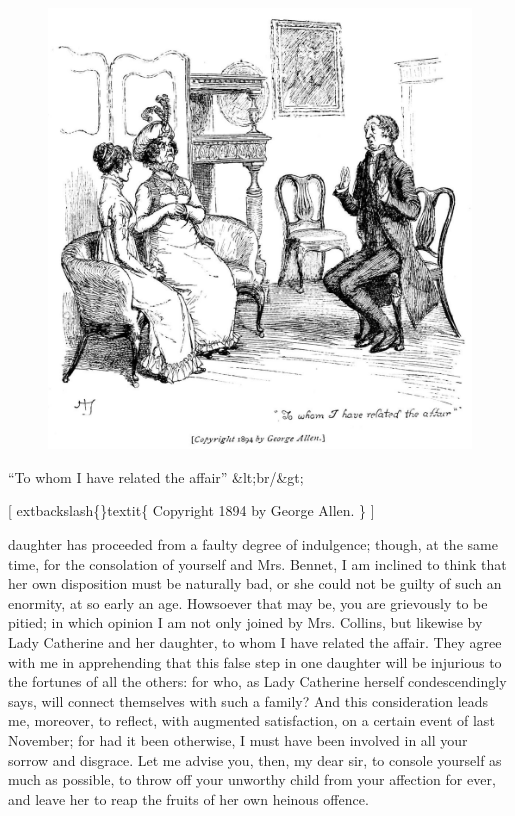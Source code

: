 \documentclass[10pt]{book}
\begin{document}
\begin{figure}[h]
\centering
\includegraphics[width=\linewidth]{images/i_392.jpg}
\end{figure}

      “To whom I have related the affair”
      &lt;br/&gt;

      [
      	extbackslash\{\}textit\{
       Copyright 1894 by George Allen.
      \}
      ]
     

    daughter has proceeded from a faulty degree of indulgence; though,
at the same time, for the consolation of yourself and Mrs. Bennet,
I am inclined to think that her own disposition must be naturally
bad, or she could not be guilty of such an enormity, at so early an
age. Howsoever that may be, you are grievously to be pitied;
    in
which opinion I am not only joined by Mrs. Collins, but likewise by
Lady Catherine and her daughter, to whom I have related the affair.
They agree with me in apprehending that this false step in one
daughter will be injurious to the fortunes of all the others: for
who, as Lady Catherine herself condescendingly says, will connect
themselves with such a family? And this consideration leads me,
moreover, to reflect, with augmented satisfaction, on a certain
event of last November; for had it been otherwise, I must have been
involved in all your sorrow and disgrace. Let me advise you, then,
my dear sir, to console yourself as much as possible, to throw off
your unworthy child from your affection for ever, and leave her to
reap the fruits of her own heinous offence.
   
\end{document}
